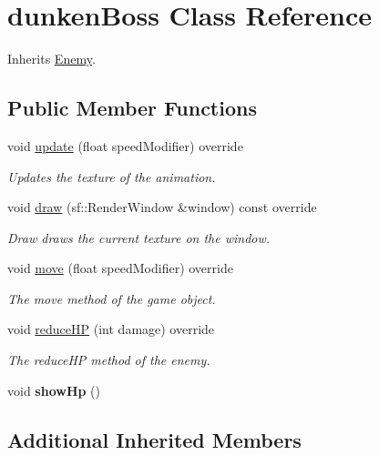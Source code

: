 \hypertarget{classdunken_boss}{\section{dunken\+Boss Class Reference}
\label{classdunken_boss}
}


Inherits \hyperlink{class_enemy}{Enemy}.

\subsection*{Public Member Functions}
\begin{DoxyCompactItemize}
\item 
void \hyperlink{classdunken_boss_ad9ae91ab3ce0b97ee48ab90203c7e4fd}{update} (float speed\+Modifier) override
\begin{DoxyCompactList}\small\item\em Updates the texture of the animation. \end{DoxyCompactList}\item 
void \hyperlink{classdunken_boss_a5b2bf5b73f34e1970fd47985a2671f86}{draw} (sf\+::\+Render\+Window \&window) const override
\begin{DoxyCompactList}\small\item\em Draw draws the current texture on the window. \end{DoxyCompactList}\item 
void \hyperlink{classdunken_boss_a298c2278b70343f32cc44ab0bb52ef77}{move} (float speed\+Modifier) override
\begin{DoxyCompactList}\small\item\em The move method of the game object. \end{DoxyCompactList}\item 
void \hyperlink{classdunken_boss_a5bf9bfb79d92656ad08995cf0fca13f0}{reduce\+H\+P} (int damage) override
\begin{DoxyCompactList}\small\item\em The reduce\+H\+P method of the enemy. \end{DoxyCompactList}\item 
\hypertarget{classdunken_boss_ad17c38732ddca5502bc07cbeee9bde44}{void {\bfseries show\+Hp} ()}\label{classdunken_boss_ad17c38732ddca5502bc07cbeee9bde44}

\end{DoxyCompactItemize}
\subsection*{Additional Inherited Members}


